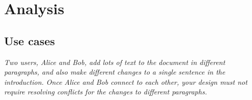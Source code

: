 \documentclass[11pt,titlepage]{article}
\begin{document}


\section{Analysis}

\subsection{Use cases}

\emph{Two users, Alice and Bob, add lots of text to the document in
  different paragraphs, and also make different changes to a single
  sentence in the introduction. Once Alice and Bob connect to each
  other, your design must not require resolving conflicts for the
  changes to different paragraphs.}

\vspace{5mm}
\end{document}
